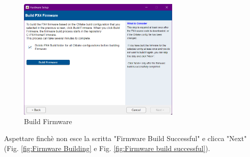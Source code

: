 \begin{figure}[H] %
  \centering
  \includegraphics[width=0.7\textwidth]{files/images/matlab13.png} %
  \caption{Build Firmware} %
  \label{fig:Build Firmware} %
\end{figure}
\noindent
Aspettare finchè non esce la scritta "Firmware Build Successful" e clicca "Next" (Fig. \ref{fig:Firmware Building} e Fig. \ref{fig:Firmware build successful}).
